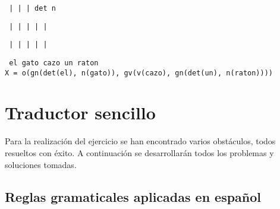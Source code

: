 \documentclass[a4paper]{article}
\begin{document}
        \texttt{ |      |       |     det      n}

        \texttt{ |      |       |      |       |}

        \texttt{ |      |       |      |       |}

        \texttt{ el    gato    cazo    un    raton}\\

        \texttt{X = o(gn(det(el), n(gato)), gv(v(cazo), gn(det(un), n(raton))))}


    \section*{Traductor sencillo}

    Para la realización del ejercicio se han encontrado varios obstáculos, todos resueltos con éxito. A continuación se desarrollarán todos los problemas y soluciones tomadas.

    \subsection*{Reglas gramaticales aplicadas en español}
\end{document}
